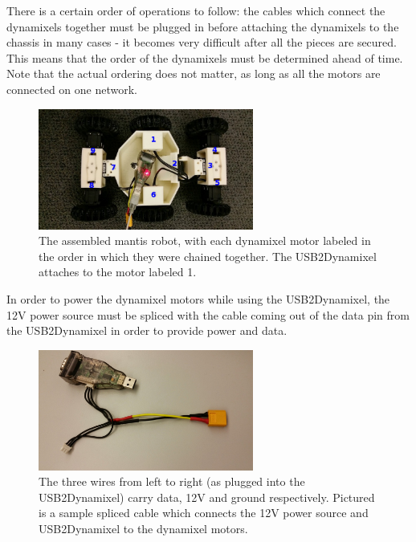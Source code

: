 \documentclass[]{article}
\begin{document}
There is a certain order of operations to follow: the cables which connect the dynamixels together must be plugged in before attaching the dynamixels to the chassis in many cases - it becomes very difficult after all the pieces are secured. This means that the order of the dynamixels must be determined ahead of time. Note that the actual ordering does not matter, as long as all the motors are connected on one network.
\begin{figure}[H]
\centering
\includegraphics[width=200pt]{report_images/top_down.jpg}
\caption{The assembled mantis robot, with each dynamixel motor labeled in the order in which they were chained together. The USB2Dynamixel attaches to the motor labeled 1.}
\end{figure}
In order to power the dynamixel motors while using the USB2Dynamixel, the 12V power source must be spliced with the cable coming out of the data pin from the USB2Dynamixel in order to provide power and data.
\begin{figure}[H]
\centering
\includegraphics[width=200pt]{report_images/splice.jpg}
\caption{The three wires from left to right (as plugged into the USB2Dynamixel) carry data, 12V and ground respectively. Pictured is a sample spliced cable which connects the 12V power source and USB2Dynamixel to the dynamixel motors.}
\end{figure}
\end{document}
